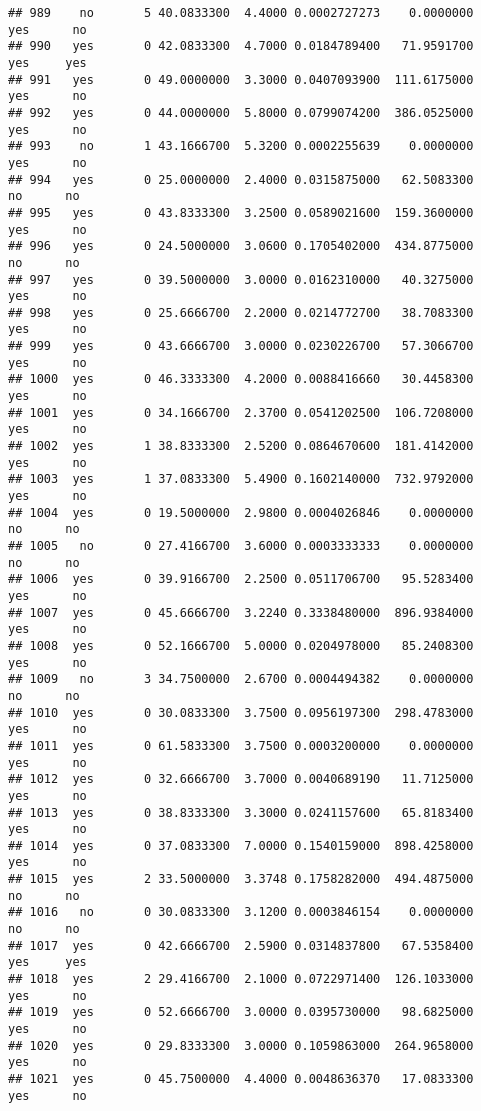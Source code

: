 \documentclass[]{article}
\begin{document}
\begin{verbatim}
## 989    no       5 40.0833300  4.4000 0.0002727273    0.0000000   yes      no
## 990   yes       0 42.0833300  4.7000 0.0184789400   71.9591700   yes     yes
## 991   yes       0 49.0000000  3.3000 0.0407093900  111.6175000   yes      no
## 992   yes       0 44.0000000  5.8000 0.0799074200  386.0525000   yes      no
## 993    no       1 43.1666700  5.3200 0.0002255639    0.0000000   yes      no
## 994   yes       0 25.0000000  2.4000 0.0315875000   62.5083300    no      no
## 995   yes       0 43.8333300  3.2500 0.0589021600  159.3600000   yes      no
## 996   yes       0 24.5000000  3.0600 0.1705402000  434.8775000    no      no
## 997   yes       0 39.5000000  3.0000 0.0162310000   40.3275000   yes      no
## 998   yes       0 25.6666700  2.2000 0.0214772700   38.7083300   yes      no
## 999   yes       0 43.6666700  3.0000 0.0230226700   57.3066700   yes      no
## 1000  yes       0 46.3333300  4.2000 0.0088416660   30.4458300   yes      no
## 1001  yes       0 34.1666700  2.3700 0.0541202500  106.7208000   yes      no
## 1002  yes       1 38.8333300  2.5200 0.0864670600  181.4142000   yes      no
## 1003  yes       1 37.0833300  5.4900 0.1602140000  732.9792000   yes      no
## 1004  yes       0 19.5000000  2.9800 0.0004026846    0.0000000    no      no
## 1005   no       0 27.4166700  3.6000 0.0003333333    0.0000000    no      no
## 1006  yes       0 39.9166700  2.2500 0.0511706700   95.5283400   yes      no
## 1007  yes       0 45.6666700  3.2240 0.3338480000  896.9384000   yes      no
## 1008  yes       0 52.1666700  5.0000 0.0204978000   85.2408300   yes      no
## 1009   no       3 34.7500000  2.6700 0.0004494382    0.0000000    no      no
## 1010  yes       0 30.0833300  3.7500 0.0956197300  298.4783000   yes      no
## 1011  yes       0 61.5833300  3.7500 0.0003200000    0.0000000   yes      no
## 1012  yes       0 32.6666700  3.7000 0.0040689190   11.7125000   yes      no
## 1013  yes       0 38.8333300  3.3000 0.0241157600   65.8183400   yes      no
## 1014  yes       0 37.0833300  7.0000 0.1540159000  898.4258000   yes      no
## 1015  yes       2 33.5000000  3.3748 0.1758282000  494.4875000    no      no
## 1016   no       0 30.0833300  3.1200 0.0003846154    0.0000000    no      no
## 1017  yes       0 42.6666700  2.5900 0.0314837800   67.5358400   yes     yes
## 1018  yes       2 29.4166700  2.1000 0.0722971400  126.1033000   yes      no
## 1019  yes       0 52.6666700  3.0000 0.0395730000   98.6825000   yes      no
## 1020  yes       0 29.8333300  3.0000 0.1059863000  264.9658000   yes      no
## 1021  yes       0 45.7500000  4.4000 0.0048636370   17.0833300   yes      no

\end{verbatim}
\end{document}

